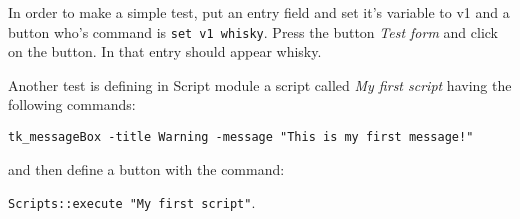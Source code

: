In order to make a simple test, put an entry field and set it's variable 
to v1 and a button who's command is \texttt{set v1 whisky}. Press the button
\emph{Test form} and click on the button. In that entry should appear whisky. 

Another test is defining in Script module a script called
\emph{My first script} having the following commands:

\texttt{tk\_messageBox -title Warning -message "This is my first message!"}

and then define a button with the command:

\texttt{Scripts::execute "My first script"}.
